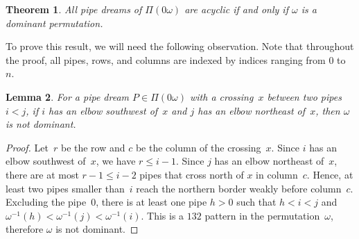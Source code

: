 \documentclass[reqno]{amsart}
\newtheorem{theorem}{Theorem}[section]
\newtheorem{lemma}[theorem]{Lemma}
\theoremstyle{definition}
\newcommand{\pipeDreams}{\Pi} %
\begin{document}
\begin{theorem}
\label{prob:nuAcyclicProperty}
All pipe dreams of $\pipeDreams(0\omega)$ are acyclic if and only if $\omega$ is a dominant permutation.
\end{theorem}

To prove this result, we will need the following observation.
Note that throughout the proof, all pipes, rows, and columns are indexed by indices ranging from $0$ to~$n$.

\begin{lemma}
\label{lem:notDominant}
For a pipe dream $P \in \pipeDreams(0\omega)$ with a crossing~$x$ between two pipes~$i < j$, if $i$ has an elbow southwest of~$x$ and $j$ has an elbow northeast of~$x$, then $\omega$ is not dominant.
\end{lemma}

\begin{proof}
Let~$r$ be the row and $c$ be the column of the crossing~$x$. %
Since $i$ has an elbow southwest of~$x$, we have $r \le i-1$.
Since $j$ has an elbow northeast of~$x$, there are at most $r-1 \le i-2$ pipes that cross north of $x$ in column~$c$.
Hence, at least two pipes smaller than~$i$ reach the northern border weakly before column~$c$.
Excluding the pipe~$0$, there is at least one pipe $h > 0$ such that $h < i < j$ and $\omega^{-1}(h) < \omega^{-1}(j) < \omega^{-1}(i)$.
This is a $132$ pattern in the permutation~$\omega$, therefore $\omega$ is not dominant.
\end{proof}
\end{document}
